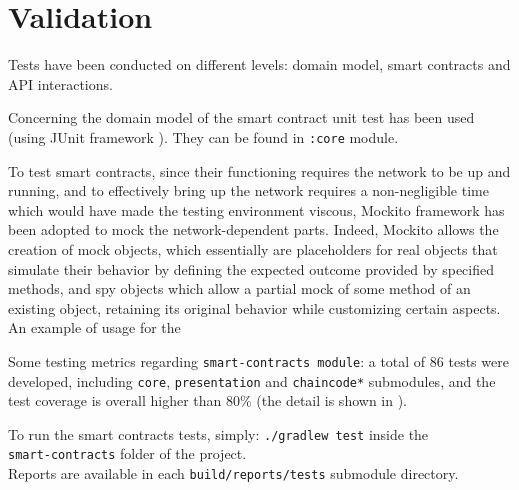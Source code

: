 \documentclass{scrartcl}
\begin{document}
\section{Validation}

\iffalse

Tests have been conducted on different levels: domain model, smart contracts and API interactions.

Concerning the domain model of the smart contract unit test has been used (using JUnit framework \cite{junit}).
%
They can be found in \texttt{:core} module.

To test smart contracts, since their functioning requires the network to be up and running, and to effectively bring up the network requires a non-negligible time which would have made the testing environment viscous, Mockito framework \cite{mockito} has been adopted to mock the network-dependent parts.
%
Indeed, Mockito allows the creation of mock objects, which essentially are placeholders for real objects that simulate their behavior by defining the expected outcome provided by specified methods, and spy objects which allow a partial mock of some method of an existing object, retaining its original behavior while customizing certain aspects.
%
An example of usage for the 



Some testing metrics regarding \texttt{smart-contracts module}: a total of 86 tests were developed, including \texttt{core}, \texttt{presentation} and \texttt{chaincode*} submodules, and the test coverage is overall higher than 80\% (the detail is shown in ).

\begin{info}
    To run the smart contracts tests, simply: \texttt{./gradlew test} inside the \\ \texttt{smart-contracts} folder of the project.
    \\
    Reports are available in each \texttt{build/reports/tests} submodule directory.
\end{info}
\end{document}

